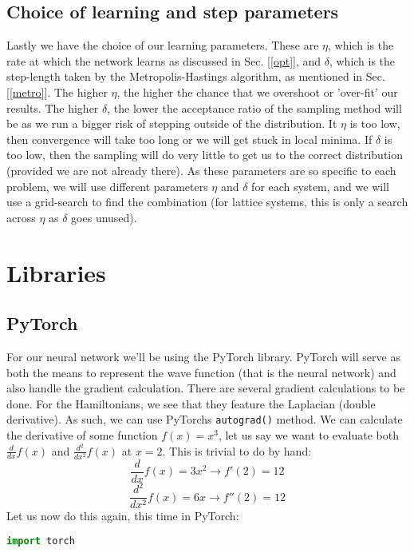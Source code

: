 \documentclass[12pt]{article}
\begin{document}
{\subsection{Choice of learning and step parameters}
Lastly we have the choice of our learning parameters. These are $\eta$, which is the rate at which the network learns as discussed in Sec. [\ref{opt}], and $\delta$, which is the step-length taken by the Metropolis-Hastings algorithm, as mentioned in Sec. [\ref{metro}]. The higher $\eta$, the higher the chance that we overshoot or 'over-fit' our results. The higher $\delta$, the lower the acceptance ratio of the sampling method will be as we run a bigger risk of stepping outside of the distribution. It $\eta$ is too low, then convergence will take too long or we will get stuck in local minima. If $\delta$ is too low, then the sampling will do very little to get us to the correct distribution (provided we are not already there). \newline
As these parameters are so specific to each problem, we will use different parameters $\eta$ and $\delta$ for each system, and we will use a grid-search to find the combination (for lattice systems, this is only a search across $\eta$ as $\delta$ goes unused).
\section{Libraries}
\subsection{PyTorch} \label{PyTorch}
For our neural network we'll be using the PyTorch library. PyTorch will serve as both the means to represent the wave function (that is the neural network) and also handle the gradient calculation. There are several gradient calculations to be done. For the Hamiltonians, we see that they feature the Laplacian (double derivative). As such, we can use PyTorchs \texttt{autograd()} method. We can calculate the derivative of some function $f(x) = x^3$, let us say we want to evaluate both $\frac{d}{dx} f(x)$ and $\frac{d^2}{dx^2} f(x)$ at $x=2$. This is trivial to do by hand:
\begin{equation*}
    \frac{d}{dx} f(x) = 3x^2 \xrightarrow[]{} f'(2) = 12
\end{equation*}
\begin{equation*}
    \frac{d^2}{dx^2} f(x) = 6x \xrightarrow[]{} f''(2) = 12
\end{equation*}
\newpage
Let us now do this again, this time in PyTorch:
\begin{lstlisting}[language=Python]
    import torch


\end{lstlisting}}
\end{document}
